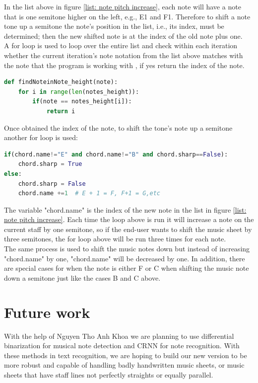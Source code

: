 \documentclass[a4paper,12pt]{report}
\begin{document}
\medskip

In the list above in figure \ref{list: note pitch increase}, each note will have
a note that is one semitone higher on the left, e.g., E1 and F1.  Therefore to
shift a note tone up a semitone the note's position in the list, i.e.,
its index, must be determined; then the new shifted note is at the index of
the old note plus one.\\

A for loop is used to loop over the entire list and check within each
iteration whether the current iteration's note notation from the list above
matches with the note that the program is working with , if yes return the index
of the note.\\

\begin{lstlisting}[language=Python]
def findNoteinNote_height(note):
    for i in range(len(notes_height)):
        if(note == notes_height[i]):
            return i
\end{lstlisting}
\medskip

Once obtained the index of the note, to shift the tone's note up a semitone 
another for loop is used:\\

\begin{lstlisting}[language=Python]
if(chord.name!="E" and chord.name!="B" and chord.sharp==False):
    chord.sharp = True
else:
    chord.sharp = False
    chord.name +=1  # E + 1 = F, F+1 = G,etc
\end{lstlisting}
\medskip
The variable "chord.name" is the index of the new note in the list in figure
\ref{list: note pitch increase}.  Each time the loop above is run it will
increase a note on the current staff by one semitone, so if the end-user wants to shift
the music sheet by three semitones, the for loop above will be run three
times for each note.\\

The same process is used to shift the music notes down but instead of increasing
"chord.name" by one, "chord.name" will be decreased by one. In addition, there are
special cases for when the note is either F or C when shifting the music note
down a semitone just like the cases B and C above.


\section{Future work}
With the help of Nguyen Tho Anh Khoa we are
planning to use differential binarization for musical note detection and CRNN
for note recognition. With these methods in text recognition, we are hoping to
build our new version to be more robust and capable of handling badly handwritten music
sheets, or music sheets that have staff lines not perfectly straights or
equally parallel.\\
\end{document}
